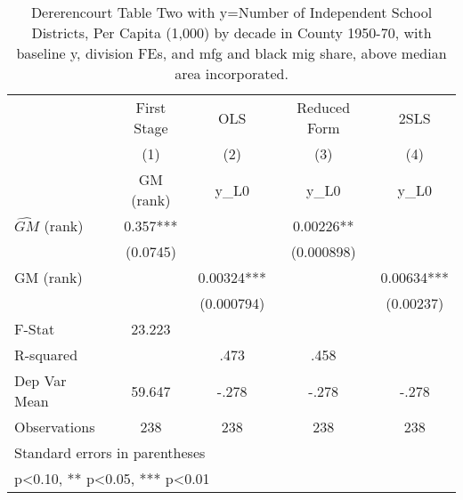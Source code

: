 \begin{table}[htbp]\centering
\def\sym#1{\ifmmode^{#1}\else\(^{#1}\)\fi}
\caption{Dererencourt Table Two with y=Number of Independent School Districts, Per Capita (1,000) by decade in County 1950-70, with baseline y, division FEs, and mfg and black mig share, above median area incorporated.}
\begin{tabular}{l*{4}{c}}
\toprule
                    & First Stage   &         OLS   &Reduced Form   &        2SLS   \\
                    &\multicolumn{1}{c}{(1)}&\multicolumn{1}{c}{(2)}&\multicolumn{1}{c}{(3)}&\multicolumn{1}{c}{(4)}\\
                    &\multicolumn{1}{c}{GM  (rank)}&\multicolumn{1}{c}{y\_L0}&\multicolumn{1}{c}{y\_L0}&\multicolumn{1}{c}{y\_L0}\\
\midrule
$\hat{GM}$ (rank)   &       0.357***&               &     0.00226** &               \\
                    &    (0.0745)   &               &  (0.000898)   &               \\
\addlinespace
GM  (rank)          &               &     0.00324***&               &     0.00634***\\
                    &               &  (0.000794)   &               &   (0.00237)   \\
\midrule
F-Stat              &      23.223   &               &               &               \\
R-squared           &               &        .473   &        .458   &               \\
Dep Var Mean        &      59.647   &       -.278   &       -.278   &       -.278   \\
Observations        &         238   &         238   &         238   &         238   \\
\bottomrule
\multicolumn{5}{l}{\footnotesize Standard errors in parentheses}\\
\multicolumn{5}{l}{\footnotesize * p<0.10, ** p<0.05, *** p<0.01}\\
\end{tabular}
\end{table}
